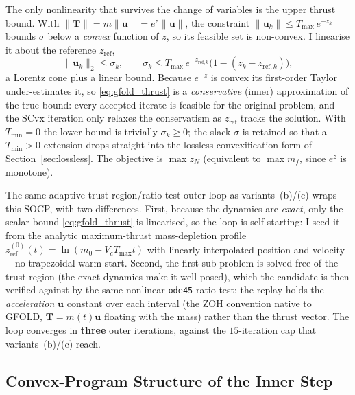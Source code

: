 \documentclass[../main.tex]{subfiles}
\begin{document}
The only nonlinearity that survives the change of variables is the upper thrust bound. With $\|\mathbf{T}\| = m\|\mathbf{u}\| = e^{z}\|\mathbf{u}\|$, the constraint $\|\mathbf{u}_k\| \leq T_{\max}\,e^{-z_k}$ bounds $\sigma$ below a \emph{convex} function of $z$, so its feasible set is non-convex. I linearise it about the reference $z_{\mathrm{ref}}$,
\begin{equation}
    \|\mathbf{u}_k\|_2 \leq \sigma_k, \qquad
    \sigma_k \leq T_{\max}\,e^{-z_{\mathrm{ref},k}}\bigl(1 - (z_k - z_{\mathrm{ref},k})\bigr),
    \label{eq:gfold_thrust}
\end{equation}
a Lorentz cone plus a linear bound. Because $e^{-z}$ is convex its first-order Taylor under-estimates it, so \eqref{eq:gfold_thrust} is a \emph{conservative} (inner) approximation of the true bound: every accepted iterate is feasible for the original problem, and the SCvx iteration only relaxes the conservatism as $z_{\mathrm{ref}}$ tracks the solution. With $T_{\min}=0$ the lower bound is trivially $\sigma_k\geq 0$; the slack $\sigma$ is retained so that a $T_{\min}>0$ extension drops straight into the lossless-convexification form of Section~\ref{sec:lossless}. The objective is $\max z_N$ (equivalent to $\max m_f$, since $e^z$ is monotone).

The same adaptive trust-region/ratio-test outer loop as variants~(b)/(c) wraps this SOCP, with two differences. First, because the dynamics are \emph{exact}, only the scalar bound \eqref{eq:gfold_thrust} is linearised, so the loop is self-starting: I seed it from the analytic maximum-thrust mass-depletion profile $z_{\mathrm{ref}}^{(0)}(t) = \ln\!\left(m_0 - V_c T_{\max} t\right)$ with linearly interpolated position and velocity---no trapezoidal warm start. Second, the first sub-problem is solved free of the trust region (the exact dynamics make it well posed), which the candidate is then verified against by the same nonlinear \texttt{ode45} ratio test; the replay holds the \emph{acceleration} $\mathbf{u}$ constant over each interval (the ZOH convention native to GFOLD, $\mathbf{T} = m(t)\mathbf{u}$ floating with the mass) rather than the thrust vector. The loop converges in \textbf{three} outer iterations, against the $15$-iteration cap that variants~(b)/(c) reach.

\subsection{Convex-Program Structure of the Inner Step}\label{sec:socp_class}
\end{document}
